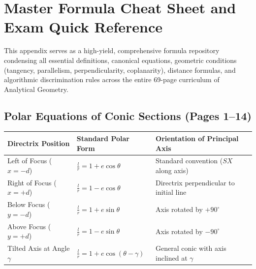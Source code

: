 \chapter{Master Formula Cheat Sheet and Exam Quick Reference}
\label{ch:cheat_sheet}

\begin{conceptbox}
This appendix serves as a high-yield, comprehensive formula repository condensing all essential definitions, canonical equations, geometric conditions (tangency, parallelism, perpendicularity, coplanarity), distance formulas, and algorithmic discrimination rules across the entire 69-page curriculum of Analytical Geometry.
\end{conceptbox}

\section{Polar Equations of Conic Sections (Pages 1--14)}

\begin{theorembox}
\begin{center}
\small
\renewcommand{\arraystretch}{1.25}
\setlength{\tabcolsep}{4pt}
\begin{tabular}{|p{3.8cm}|p{4.2cm}|p{5.8cm}|}
\hline
\textbf{Directrix Position} & \textbf{Standard Polar Form} & \textbf{Orientation of Principal Axis} \\
\hline
Left of Focus ($x = -d$) & $\displaystyle \frac{l}{r} = 1 + e\cos\theta$ & Standard convention ($SX$ along axis) \\
Right of Focus ($x = +d$) & $\displaystyle \frac{l}{r} = 1 - e\cos\theta$ & Directrix perpendicular to initial line \\
Below Focus ($y = -d$) & $\displaystyle \frac{l}{r} = 1 + e\sin\theta$ & Axis rotated by $+90^\circ$ \\
Above Focus ($y = +d$) & $\displaystyle \frac{l}{r} = 1 - e\sin\theta$ & Axis rotated by $-90^\circ$ \\
Tilted Axis at Angle $\gamma$ & $\displaystyle \frac{l}{r} = 1 + e\cos(\theta - \gamma)$ & General conic with axis inclined at $\gamma$ \\
\hline
\end{tabular}
\end{center}
\end{theorembox}

